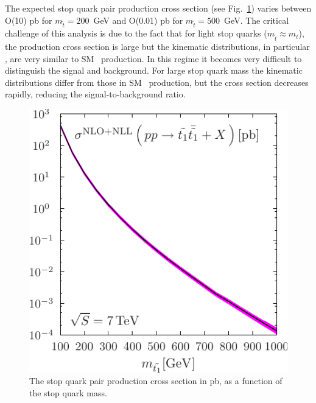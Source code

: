 The expected stop quark pair production cross section (see Fig.~\ref{fig:stopxsec}) varies between O(10) pb
for $m_{\tilde{t}}=200$~GeV and O(0.01) pb for $m_{\tilde{t}}=500$~GeV. The critical challenge of this analysis
is due to the fact that for light stop quarks ($m_{\tilde{t}} \approx m_t$), the production cross section is
large but the kinematic distributions, in particular \mt, are very similar to SM \ttbar\ production. In this regime 
it becomes very
difficult to distinguish the signal and background. For large stop quark mass the kinematic distributions differ
from those in SM \ttbar\ production, but the cross section decreases rapidly, reducing the signal-to-background
ratio.

\begin{figure}[hbt]
  \begin{center}
	\includegraphics[width=0.5\linewidth]{plots/total_scale_pdf_LHC-eps-converted-to.pdf}
	\caption{
	  \label{fig:stopxsec}\protect 
          The stop quark pair production cross section in pb, as a function of the stop quark mass.}
  \end{center}
\end{figure}

